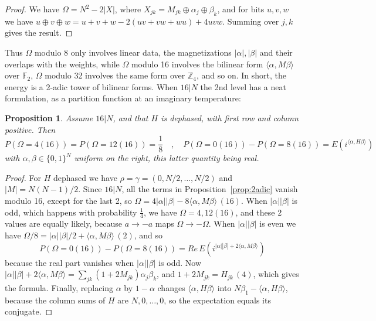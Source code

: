 \documentclass[11pt,a4paper]{article}
\newtheorem{prop}[thm]{Proposition}
\theoremstyle{remark}
\begin{document}
\begin{proof}
We have $\Omega=N^2-2|X|$, where $X_{jk}=M_{jk}\oplus\alpha_j\oplus\beta_k$, and for bits $u,v,w$ we have $u\oplus v\oplus w=u+v+w-2(uv+vw+wu)+4uvw$. Summing over $j,k$ gives the result.
\end{proof}

Thus $\Omega$ modulo 8 only involves linear data, the magnetizations $|\alpha|,|\beta|$ and their overlaps with the weights, while $\Omega$ modulo 16 involves the bilinear form $\langle\alpha,M\beta\rangle$ over $\mathbb F_2$, $\Omega$ modulo 32 involves the same form over $\mathbb Z_4$, and so on. In short, the energy is a 2-adic tower of bilinear forms. When $16|N$ the 2nd level has a neat formulation, as a partition function at an imaginary temperature:

\begin{samepage}
\begin{prop}\label{prop:imaginary}
Assume $16|N$, and that $H$ is dephased, with first row and column positive. Then
\[
 P(\Omega=4(16))=P(\Omega=12(16))=\frac{1}{8}\quad,\quad P(\Omega=0(16))-P(\Omega=8(16))=E\left(i^{\langle\alpha,H\beta\rangle}\right)
\]
with $\alpha,\beta\in\{0,1\}^N$ uniform on the right, this latter quantity being real.
\end{prop}
\end{samepage}

\begin{proof}
For $H$ dephased we have $\rho=\gamma=(0,N/2,\ldots,N/2)$ and $|M|=N(N-1)/2$. Since $16|N$, all the terms in Proposition~\ref{prop:2adic} vanish modulo 16, except for the last 2, so $\Omega=4|\alpha||\beta|-8\langle\alpha,M\beta\rangle\,(16)$. When $|\alpha||\beta|$ is odd, which happens with probability $\frac{1}{4}$, we have $\Omega=4,12(16)$, and these 2 values are equally likely, because $a\to-a$ maps $\Omega\to-\Omega$. When $|\alpha||\beta|$ is even we have $\Omega/8=|\alpha||\beta|/2+\langle\alpha,M\beta\rangle\,(2)$, and so
\[
 P(\Omega=0(16))-P(\Omega=8(16))=Re\,E\left(i^{|\alpha||\beta|+2\langle\alpha,M\beta\rangle}\right)
\]
because the real part vanishes when $|\alpha||\beta|$ is odd. Now $|\alpha||\beta|+2\langle\alpha,M\beta\rangle=\sum_{jk}(1+2M_{jk})\alpha_j\beta_k$, and $1+2M_{jk}=H_{jk}\,(4)$, which gives the formula. Finally, replacing $\alpha$ by $1-\alpha$ changes $\langle\alpha,H\beta\rangle$ into $N\beta_1-\langle\alpha,H\beta\rangle$, because the column sums of $H$ are $N,0,\ldots,0$, so the expectation equals its conjugate.
\end{proof}
\end{document}
